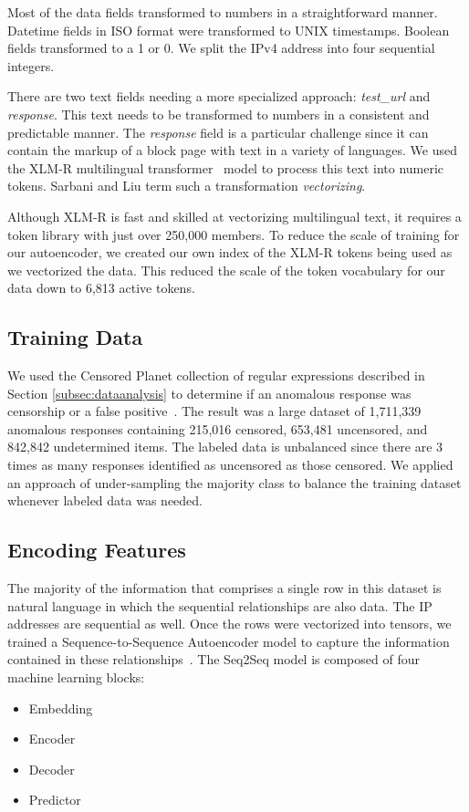 Most of the data fields transformed to numbers in a straightforward manner. Datetime fields in ISO format were transformed to UNIX timestamps. Boolean fields transformed to a 1 or 0. We split the IPv4 address into four sequential integers.

There are two text fields needing a more specialized approach: \textit{test\_url} and \textit{response}. This text needs to be transformed to numbers in a consistent and predictable manner. The \textit{response} field is a particular challenge since it can contain the markup of a block page with text in a variety of languages. We used the XLM-R multilingual transformer~\cite{conneau_unsupervised_2020} model to process this text into numeric tokens. Sarbani and Liu term such a transformation \textit{vectorizing}.

Although XLM-R is fast and skilled at vectorizing multilingual text, it requires a token library with just over 250,000 members.  To reduce the scale of training for our autoencoder, we created our own index of the XLM-R tokens being used as we vectorized the data. This reduced the scale of the token vocabulary for our data down to 6,813 active tokens.

\subsection{Training Data}\label{subsec:training}
We used the Censored Planet collection of regular expressions described in Section \ref{subsec:dataanalysis} to determine if an anomalous response was censorship or a false positive~\cite{sarah_laplante_blockpage_2021}. The result was a large dataset of 1,711,339 anomalous responses containing 215,016 censored, 653,481 uncensored, and 842,842 undetermined items. The labeled data is unbalanced since there are 3 times as many responses identified as uncensored as those censored. We applied an approach of under-sampling the majority class to balance the training dataset whenever labeled data was needed.

\subsection{Encoding Features}\label{subsec:encoding}
The majority of the information that comprises a single row in this dataset is natural language in which the sequential relationships are also data. The IP addresses are sequential as well. Once the rows were vectorized into tensors, we trained a Sequence-to-Sequence Autoencoder model to capture the information contained in these relationships~\cite{raff_inside_2021}. The Seq2Seq model is composed of four machine learning blocks: 
\begin{itemize}
    \item Embedding
    \item Encoder
    \item Decoder
    \item Predictor
\end{itemize}

